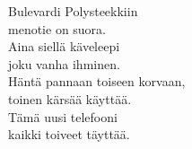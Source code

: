 
            Bulevardi Polysteekkiin \\
            menotie on suora. \\
            Aina siellä käveleepi \\
            joku vanha ihminen. \\
            Häntä pannaan toiseen korvaan, \\
            toinen kärsää käyttää. \\
            Tämä uusi telefooni \\
            kaikki toiveet täyttää. \\
